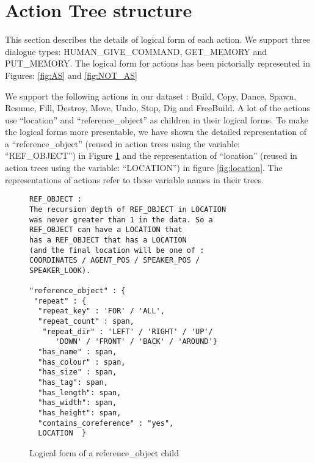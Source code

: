 \clearpage

\section{Action Tree structure}
\label{sec:action_tree}

This section describes the details of logical form of each action.
We support three dialogue types: HUMAN\_GIVE\_COMMAND, GET\_MEMORY and PUT\_MEMORY.
The logical form for actions has been pictorially represented in Figures: \ref{fig:AS} and \ref{fig:NOT_AS}

We support the following actions in our dataset : Build, Copy, Dance, Spawn, Resume, Fill, Destroy, Move, Undo, Stop, Dig and FreeBuild.
A lot of the actions use  ``location'' and ``reference\_object'' as children in their logical forms. To make the logical forms more presentable, we have shown the detailed representation of a ``reference\_object'' (reused in action trees using the variable: ``REF\_OBJECT'') in Figure \ref{fig:ref_obj} and the representation of ``location'' (reused in action trees using the variable: ``LOCATION'') in figure \ref{fig:location}. The representations of actions refer to these variable names in their trees.


\begin{figure}[ht]
    \centering
    \fontsize{7pt}{8pt}\selectfont
    \begin{verbatim}
REF_OBJECT :
The recursion depth of REF_OBJECT in LOCATION 
was never greater than 1 in the data. So a 
REF_OBJECT can have a LOCATION that 
has a REF_OBJECT that has a LOCATION 
(and the final location will be one of : 
COORDINATES / AGENT_POS / SPEAKER_POS / 
SPEAKER_LOOK).

"reference_object" : {
 "repeat" : {
  "repeat_key" : 'FOR' / 'ALL',
  "repeat_count" : span,
   "repeat_dir" : 'LEFT' / 'RIGHT' / 'UP'/ 
      'DOWN' / 'FRONT' / 'BACK' / 'AROUND'}
  "has_name" : span,
  "has_colour" : span,
  "has_size" : span,
  "has_tag": span,
  "has_length": span,
  "has_width": span,
  "has_height": span,
  "contains_coreference" : "yes",
  LOCATION  }
    \end{verbatim}
    \vspace{-20pt}
    \caption{Logical form of a reference\_object child}
    \vspace{-8pt}
    \label{fig:ref_obj}
\end{figure}


